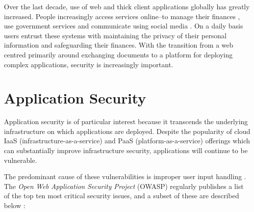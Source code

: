 Over the last decade, use of web and thick client applications globally has greatly increased.
People increasingly access services online--to manage their finances \citep{jayawardhena2000changes}, use government
services \citep{fox2010directgov} and communicate using social media \citep{boulianne2015social}.
On a daily basis users entrust these systems with maintaining the privacy of their personal information and safeguarding
their finances.
With the transition from a web centred primarily around exchanging documents to a platform for deploying complex
applications, security is increasingly important.

\section{Application Security}

Application security is of particular interest because it transcends the underlying infrastructure on which applications
are deployed.
Despite the popularity of cloud IaaS (infrastructure-as-a-service) and PaaS (platform-as-a-service)
offerings which can substantially improve infrastructure security, applications will continue to be vulnerable.

The predominant cause of these vulnerabilities is improper user input handling \citep{schneier2011secrets}.
The \emph{Open Web Application Security Project} (OWASP) regularly publishes a list of the top ten most critical
security issues, and a subset of these are described below \citep{owasp10}:

